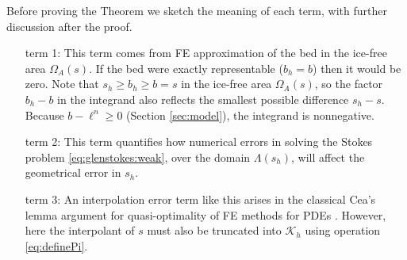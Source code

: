 \documentclass[hidelinks,onefignum,onetabnum,final]{siamart220329}  %
\newcommand{\cK}{\mathcal{K}}
\begin{document}
Before proving the Theorem we sketch the meaning of each term, with further discussion after the proof.

\medskip
\begin{itemize}
\item[term 1:]  This term comes from FE approximation of the bed in the ice-free area $\Omega_A(s)$.  If the bed were exactly representable ($b_h=b$) then it would be zero.  Note that $s_h \ge b_h \ge b = s$ in the ice-free area $\Omega_A(s)$, so the factor $b_h-b$ in the integrand also reflects the smallest possible difference $s_h - s$.  Because $b-\ell^n\ge 0$ (Section \ref{sec:model}), the integrand is nonnegative.

\item[term 2:]  This term quantifies how numerical errors in solving the Stokes problem \eqref{eq:glenstokes:weak}, over the domain $\Lambda(s_h)$, will affect the geometrical error in $s_h$.

\item[term 3:]  An interpolation error term like this arises in the classical Cea's lemma argument for quasi-optimality of FE methods for PDEs \cite{Ciarlet2002}.  However, here the interpolant of $s$ must also be truncated into $\cK_h$ using operation \eqref{eq:definePi}.
\end{itemize}
\end{document}
